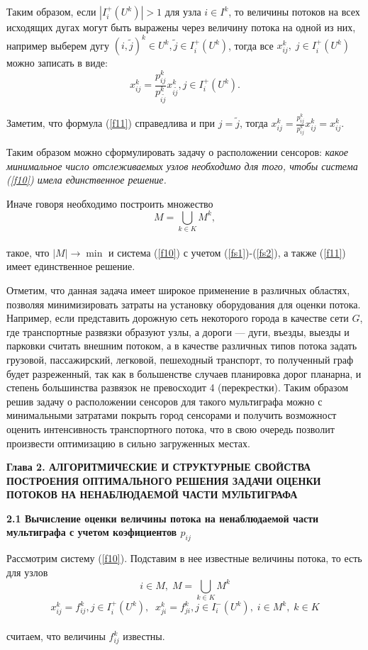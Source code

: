 \documentclass[14pt]{extarticle}%
\begin{document}
Таким образом, если $|I^+_i(U^k)|>1$ для узла $i\in I^k$, то величины потоков на всех исходящих дугах могут быть выражены через величину потока на одной из них, например выберем дугу $(i, \tilde j)^k\in U^k, \tilde j\in I_i^+(U^k)$, тогда все $x^k_{ij},\;j\in I^+_i(U^k)$ можно записать в виде:
\begin{equation}
    x^k_{ij}=\frac{p^k_{ij}}{p^k_{i\tilde j}}x^k_{i\tilde j}, j\in I^+_i(U^k).\label{f11}
\end{equation}

Заметим, что формула (\ref{f11}) справедлива и при $j=\tilde j$, тогда $x^k_{ij}=\frac{p^k_{ij}}{p^k_{ij}}x^k_{ij}=x^k_{ij}$.

Таким образом можно сформулировать задачу о расположении сенсоров: {\it какое минимальное число отслеживаемых узлов необходимо для того, чтобы система (\ref{f10}) имела единственное решение.}

Иначе говоря необходимо построить множество
$$M=\bigcup_{k\in K}M^k,$$
\\
такое, что $|M|\to \min$ и система (\ref{f10}) с учетом (\ref{fs1})-(\ref{fs2}), а также (\ref{f11}) имеет единственное решение.

Отметим, что данная задача имеет широкое применение в различных областях, позволяя минимизировать затраты на установку оборудования для оценки потока. Например, если представить дорожную сеть некоторого города в качестве сети $G$, где транспортные развязки образуют узлы, а дороги --- дуги, въезды, выезды и парковки считать внешним потоком, а в качестве различных типов потока задать грузовой, пассажирский, легковой, пешеходный транспорт, то полученный граф будет разреженный, так как в большенстве случаев планировка дорог планарна, и степень большинства развязок не превосходит 4 (перекрестки). Таким образом решив задачу о расположении сенсоров для такого мультиграфа можно с минимальными затратами покрыть город сенсорами и получить возможност оценить интенсивность транспортного потока, что в свою очередь позволит произвести оптимизацию в сильно загруженных местах.
\newpage
\begin{center}
    \textbf{Глава 2. АЛГОРИТМИЧЕСКИЕ И СТРУКТУРНЫЕ СВОЙСТВА ПОСТРОЕНИЯ ОПТИМАЛЬНОГО РЕШЕНИЯ ЗАДАЧИ ОЦЕНКИ ПОТОКОВ НА НЕНАБЛЮДАЕМОЙ ЧАСТИ МУЛЬТИГРАФА}
\end{center}

\textbf{2.1 Вычисление оценки величины потока на ненаблюдаемой части мультиграфа с учетом коэфициентов $p_{ij}$}

Рассмотрим систему (\ref{f10}). Подставим в нее известные величины потока, то есть для узлов
$$i\in M,\; M=\bigcup_{k\in K}M^k$$
$$
x^k_{ij}=f^k_{ij}, j\in I^+_i(U^k),\;\; x^k_{ji}=f^k_{ji}, j\in I^-_i(U^k),\; i\in M^k,\;k\in K
$$\\
считаем, что величины $f^k_{ij}$ известны.
\end{document}
